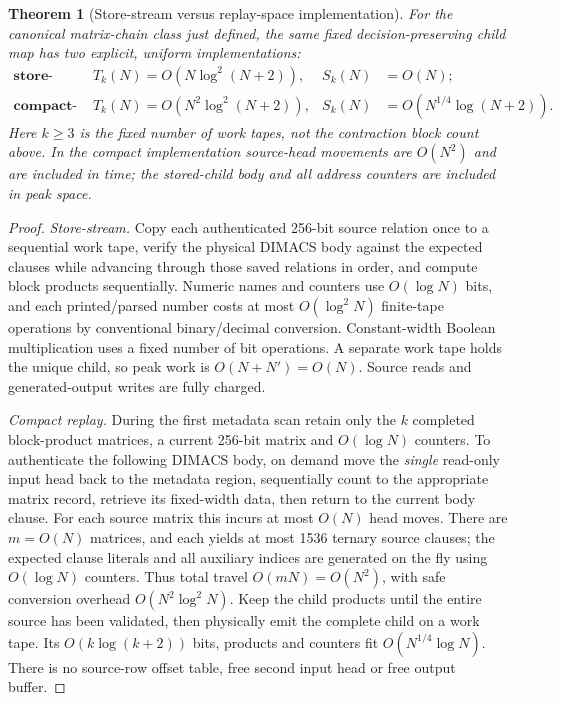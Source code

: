 \documentclass[11pt]{article}
\newtheorem{theorem}{Theorem}
\begin{document}
\begin{theorem}[Store-stream versus replay-space implementation]
For the canonical matrix-chain class just defined, the same fixed decision-preserving child map has two explicit, uniform implementations:
\begin{align*}
\textbf{store-stream: }& T_{k}(N)=O(N\log^2(N+2)), & S_{k}(N)&=O(N);\\
\textbf{compact-replay: }& T_{k}(N)=O(N^2\log^2(N+2)), & S_{k}(N)&=O(N^{1/4}\log(N+2)).
\end{align*}
Here $k\ge3$ is the fixed number of work tapes, not the contraction block count above. In the compact implementation source-head movements are $O(N^2)$ and are included in time; the stored-child body and all address counters are included in peak space.
\end{theorem}
\begin{proof}
\emph{Store-stream.} Copy each authenticated 256-bit source relation once to a sequential work tape, verify the physical DIMACS body against the expected clauses while advancing through those saved relations in order, and compute block products sequentially. Numeric names and counters use $O(\log N)$ bits, and each printed/parsed number costs at most $O(\log^2 N)$ finite-tape operations by conventional binary/decimal conversion. Constant-width Boolean multiplication uses a fixed number of bit operations. A separate work tape holds the unique child, so peak work is $O(N+N')=O(N)$. Source reads and generated-output writes are fully charged.

\emph{Compact replay.} During the first metadata scan retain only the $k$ completed block-product matrices, a current 256-bit matrix and $O(\log N)$ counters. To authenticate the following DIMACS body, on demand move the \emph{single} read-only input head back to the metadata region, sequentially count to the appropriate matrix record, retrieve its fixed-width data, then return to the current body clause. For each source matrix this incurs at most $O(N)$ head moves. There are $m=O(N)$ matrices, and each yields at most 1536 ternary source clauses; the expected clause literals and all auxiliary indices are generated on the fly using $O(\log N)$ counters. Thus total travel $O(mN)=O(N^2)$, with safe conversion overhead $O(N^2\log^2 N)$. Keep the child products until the entire source has been validated, then physically emit the complete child on a work tape. Its $O(k\log(k+2))$ bits, products and counters fit $O(N^{1/4}\log N)$. There is no source-row offset table, free second input head or free output buffer.
\end{proof}
\end{document}
